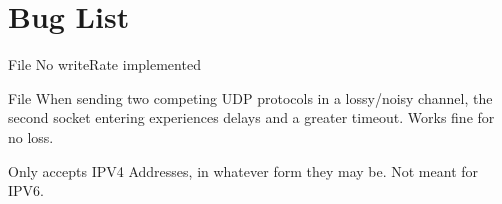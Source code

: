 \chapter{Bug List}
\hypertarget{bug}{}\label{bug}

\begin{DoxyRefList}
\item[File \doxylink{receiver_8c}{receiver.c} ]\label{bug__bug000001}%
%
No write\+Rate implemented 
\item[File \doxylink{sender_8c}{sender.c} ]\label{bug__bug000002}%
%
When sending two competing UDP protocols in a lossy/noisy channel, the second socket entering experiences delays and a greater timeout. Works fine for no loss. 



Only accepts IPV4 Addresses, in whatever form they may be. Not meant for IPV6. 
\end{DoxyRefList}